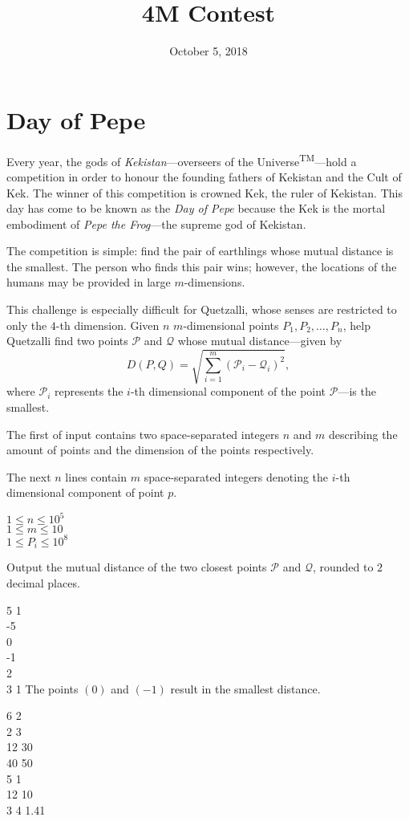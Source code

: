 \documentclass{contest-set}
\title{4M Contest}
\date{October 5, 2018}
\begin{document}
\maketitle

\section{Day of Pepe}
Every year, the gods of \textit{Kekistan}---overseers of the Universe\textsuperscript{TM}---hold a competition in order to honour the founding fathers of Kekistan and the Cult of Kek. The winner of this competition is crowned Kek, the ruler of Kekistan.  This day has come to be known as the \textit{Day of Pepe} because the Kek is the mortal embodiment of \textit{Pepe the Frog}---the supreme god of Kekistan.

The competition is simple: find the pair of earthlings whose mutual distance is the smallest. The person who finds this pair wins; however, the locations of the humans may be provided in large $m$-dimensions. 

This challenge is especially difficult for Quetzalli, whose senses are restricted to only the $4$-th dimension. Given $n$ $m$-dimensional points $P_1, P_2,\ldots,P_n$, help Quetzalli find two points $\mathcal{P}$ and $\mathcal{Q}$ whose mutual distance---given by \begin{equation*}
    D(P, Q)=\sqrt{\sum^m_{i=1}(\mathcal{P}_i-\mathcal{Q}_i)^2},
\end{equation*} where $\mathcal{P}_i$ represents the $i$-th dimensional component of the point $\mathcal{P}$---is the smallest.

The first of input contains two space-separated integers $n$ and $m$ describing the amount of points and the dimension of the points respectively.

The next $n$ lines contain $m$ space-separated integers denoting the $i$-th dimensional component of point $p$.

\constraints
$1 \leq n \leq 10^5$\\
$1 \leq m \leq 10$\\
$1 \leq P_i \leq 10^8$

\pushnewpage

\outputformat
Output the mutual distance of the two closest points $\mathcal{P}$ and $\mathcal{Q}$, rounded to $2$ decimal places.

\addsampleExplanation
{
5 1\\
-5\\
0\\
-1\\
2\\
3
}
{
1
}
{
The points $(0)$ and $(-1)$ result in the smallest distance.
}

\addsample
{
6 2\\
2 3\\
12 30\\
40 50\\
5 1\\
12 10\\
3 4
}
{
1.41
}
\end{document}
